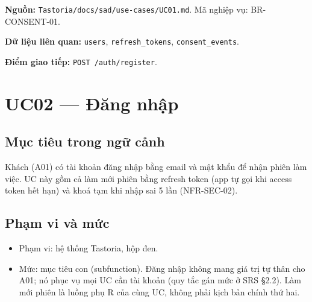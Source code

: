\textbf{Nguồn:} {\small\texttt{Tastoria/\allowbreak{}\allowbreak{}docs/\allowbreak{}\allowbreak{}sad/\allowbreak{}\allowbreak{}use-\allowbreak{}cases/\allowbreak{}\allowbreak{}UC01.\allowbreak{}md}}. Mã nghiệp vụ: BR-\allowbreak{}CONSENT-\allowbreak{}01.

\textbf{Dữ liệu liên quan:} {\small\texttt{users}}, {\small\texttt{refresh\_\allowbreak{}\allowbreak{}tokens}}, {\small\texttt{consent\_\allowbreak{}\allowbreak{}events}}.

\textbf{Điểm giao tiếp:} {\small\texttt{POST /\allowbreak{}\allowbreak{}auth/\allowbreak{}\allowbreak{}register}}.

\section{UC02 --- Đăng nhập}
\subsection{Mục tiêu trong ngữ cảnh}
Khách (A01) có tài khoản đăng nhập bằng email và mật khẩu để nhận phiên làm việc. UC này gồm cả làm mới phiên bằng refresh token (app tự gọi khi access token hết hạn) và khoá tạm khi nhập sai 5 lần (NFR-\allowbreak{}SEC-\allowbreak{}02).

\subsection{Phạm vi và mức}
\begin{itemize}
\item Phạm vi: hệ thống Tastoria, hộp đen.
\item Mức: mục tiêu con (subfunction). Đăng nhập không mang giá trị tự thân cho A01; nó phục vụ mọi UC cần tài khoản (quy tắc gán mức ở SRS \S{}2.2). Làm mới phiên là luồng phụ R của cùng UC, không phải kịch bản chính thứ hai.
\end{itemize}

